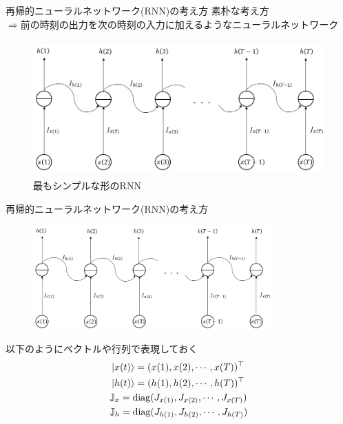 \documentclass[dvipdfmx,10pt]{beamer}
\begin{document}
  \begin{frame}{再帰的ニューラルネットワーク(RNN)の考え方}
    素朴な考え方\\
    $\Rightarrow$前の時刻の出力を次の時刻の入力に加えるようなニューラルネットワーク
    \begin{figure}
      \begin{center}
        \includegraphics[height=5.2cm]{simple_RNN.png}
      \end{center} 
      \caption{最もシンプルな形のRNN}  
    \end{figure}
  \end{frame}

  \begin{frame}{再帰的ニューラルネットワーク(RNN)の考え方}
    \begin{figure}
      \begin{center}
        \includegraphics[height=4cm]{simple_RNN.png}
      \end{center} 
    \end{figure}
    以下のようにベクトルや行列で表現しておく
    \begin{align*}
      &\ket{x(t)} = (x(1),x(2),\cdots,x(T))^{\top}\\
      &\ket{h(t)} = (h(1),h(2),\cdots,h(T))^{\top}\\
      &\mathbb{J}_x = \text{diag}(J_{x(1)},J_{x(2)},\cdots,J_{x(T)})\\
      &\mathbb{J}_h = \text{diag}(J_{h(1)},J_{h(2)},\cdots,J_{h(T)})
    \end{align*}
  \end{frame}
\end{document}
